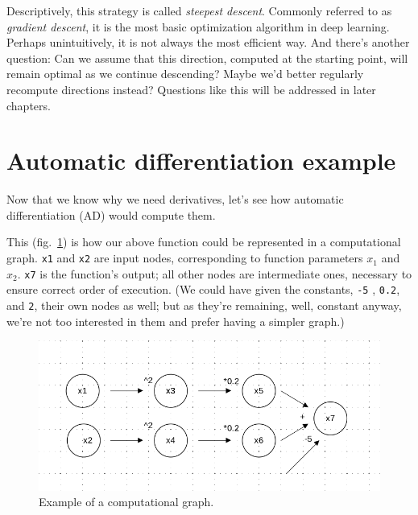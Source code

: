 \documentclass[
  letterpaper,
]{krantz}
\begin{document}
Descriptively, this strategy is called \emph{steepest
descent}. Commonly referred to as \emph{gradient
descent}, it is the most basic optimization
algorithm in deep learning. Perhaps unintuitively, it is not always the
most efficient way. And there's another question: Can we assume that
this direction, computed at the starting point, will remain optimal as
we continue descending? Maybe we'd better regularly recompute directions
instead? Questions like this will be addressed in later chapters.

\hypertarget{automatic-differentiation-example}{%
\section{Automatic differentiation
example}\label{automatic-differentiation-example}}

Now that we know why we need derivatives, let's see how automatic
differentiation (AD) would compute them.

This (fig.~\ref{fig-autograd-compgraph}) is how our above function could
be represented in a computational graph. \texttt{x1} and \texttt{x2} are
input nodes, corresponding to function parameters \(x_1\) and \(x_2\).
\texttt{x7} is the function's output; all other nodes are intermediate
ones, necessary to ensure correct order of execution. (We could have
given the constants, \texttt{-5} , \texttt{0.2}, and \texttt{2}, their
own nodes as well; but as they're remaining, well, constant anyway,
we're not too interested in them and prefer having a simpler graph.)

\begin{figure}[H]

{\centering \includegraphics{images/autograd-compgraph.png}

}

\caption{\label{fig-autograd-compgraph}Example of a computational
graph.}

\end{figure}
\end{document}
